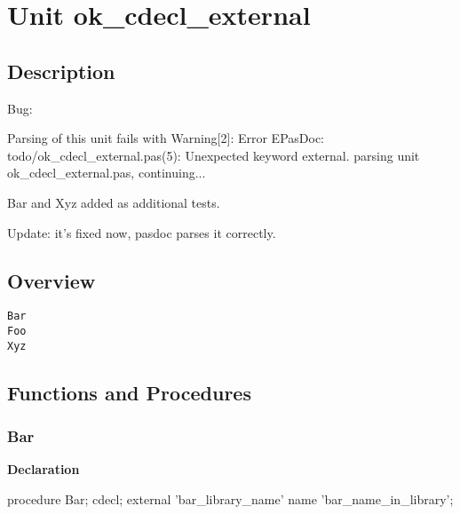 \documentclass{report}
\begin{document}
\newlength{\tmplength}
\chapter{Unit ok{\_}cdecl{\_}external}
\section{Description}
Bug:

Parsing of this unit fails with Warning[2]: Error EPasDoc: todo/ok{\_}cdecl{\_}external.pas(5): Unexpected keyword external. parsing unit ok{\_}cdecl{\_}external.pas, continuing...

Bar and Xyz added as additional tests.

Update: it's fixed now, pasdoc parses it correctly.
\section{Overview}
\begin{description}
\item[\texttt{Bar}]
\item[\texttt{Foo}]
\item[\texttt{Xyz}]
\end{description}
\section{Functions and Procedures}
\subsection*{Bar}
\begin{list}{}{
\setlength{\itemindent}{0cm}
\setlength{\listparindent}{0cm}
\setlength{\leftmargin}{\evensidemargin}
\addtolength{\leftmargin}{\tmplength}
\settowidth{\labelsep}{X}
\addtolength{\leftmargin}{\labelsep}
\setlength{\labelwidth}{\tmplength}
}
\begin{flushleft}
\item[\textbf{Declaration}\hfill]
\begin{ttfamily}
procedure Bar; cdecl; external 'bar{\_}library{\_}name' name 'bar{\_}name{\_}in{\_}library';\end{ttfamily}


\end{flushleft}
\end{list}
\end{document}

